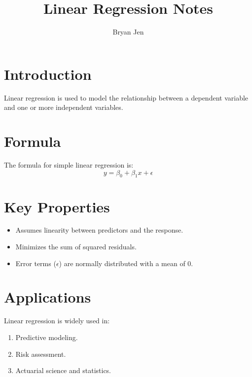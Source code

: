 \documentclass{article}
\title{Linear Regression Notes}
\author{Bryan Jen}
\date{}
\begin{document}
\maketitle

\section{Introduction}
Linear regression is used to model the relationship between a dependent variable and one or more independent variables.

\section{Formula}
The formula for simple linear regression is:
\[
y = \beta_0 + \beta_1 x + \epsilon
\]

\section{Key Properties}
\begin{itemize}
    \item Assumes linearity between predictors and the response.
    \item Minimizes the sum of squared residuals.
    \item Error terms (\(\epsilon\)) are normally distributed with a mean of 0.
\end{itemize}

\section{Applications}
Linear regression is widely used in:
\begin{enumerate}
    \item Predictive modeling.
    \item Risk assessment.
    \item Actuarial science and statistics.
\end{enumerate}
\end{document}
